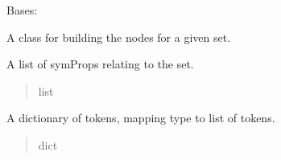 \documentclass[letterpaper,10pt,english]{sphinxmanual}
\begin{document}

\begin{fulllineitems}
\label{\detokenize{nodes:nodes.nodeBuilder.Build_set}}
\pysigstartsignatures
\pysiglinewithargsret
{}
{\sphinxparamcomma {}}
{}
\pysigstopsignatures
\sphinxAtStartPar
Bases: 

\sphinxAtStartPar
A class for building the nodes for a given set.

\begin{fulllineitems}
\label{\detokenize{nodes:nodes.nodeBuilder.Build_set.symProps}}
\pysigstartsignatures
\pysigline
{}
\pysigstopsignatures
\sphinxAtStartPar
A list of symProps relating to the set.
\begin{quote}\begin{description}
\sphinxAtStartPar
list

\end{description}\end{quote}

\end{fulllineitems}


\begin{fulllineitems}
\label{\detokenize{nodes:nodes.nodeBuilder.Build_set.tokens}}
\pysigstartsignatures
\pysigline
{}
\pysigstopsignatures
\sphinxAtStartPar
A dictionary of tokens, mapping type to list of tokens.
\begin{quote}\begin{description}
\sphinxAtStartPar
dict

\end{description}\end{quote}


\end{fulllineitems}
\end{fulllineitems}
\end{document}
